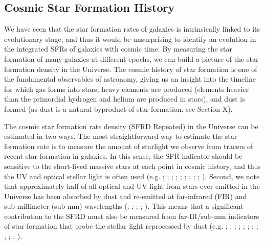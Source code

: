 \subsection{Cosmic Star Formation History}
\label{sec:cosmic_star_formation_history}

We have seen that the star formation rates of galaxies is intrinsically linked to its evolutionary stage, and thus it would be unsurprising to identify an evolution in the integrated SFRs of galaxies with cosmic time. By measuring the star formation of many galaxies at different epochs, we can build a picture of the star formation density in the Universe. The cosmic history of star formation is one of the fundamental observables of astronomy, giving us an insight into the timeline for which gas forms into stars, heavy elements are produced (elements heavier than the primordial hydrogen and helium are produced in stars), and dust is formed (as dust is a natural byproduct of star formation, see Section {\color{red}X}).

The cosmic star formation rate density (SFRD {\color{red}Repeated}) in the Universe can be estimated in two ways. The most straightforward way to estimate the star formation rate is to measure the amount of starlight we observe from tracers of recent star formation in galaxies. In this sense, the SFR indicator should be sensitive to the short-lived massive stars at each point in cosmic history, and thus the UV and optical stellar light is often used (e.g. \citealt{Madau_1996}; \citealt{Lilly_1996}; \citealt{Wyder_2005}; \citealt{Schiminovich_2005}; \citealt{Dahlen_2007}; \citealt{Reddy_2009}; \citealt{Robotham_2011}; \citealt{Cucciati_2012}; \citealt{Schenker_2013}; \citealt{Finkelstein_2015}). Second, we note that approximately half of all optical and UV light from stars ever emitted in the Universe has been absorbed by dust and re-emitted at far-infrared (FIR) and sub-millimeter (sub-mm) wavelengths (\citealt{Puget_1996}; \citealt{Fixsen_1998}; \citealt{Dole_2006}; \citealt{Driver_2008}; \citealt{Driver_2016}). This means that a significant contribution to the SFRD must also be measured from far-IR/sub-mm indicators of star formation that probe the stellar light reprocessed by dust (e.g. \citealt{Magnelli_2011}; \citealt{Casey_2012}; \citealt{Magnelli_2013}; \citealt{Gruppioni_2013}; \citealt{Swinbank_2014}; \citealt{Bouwens_2016}; \citealt{Bourne_2017}; \citealt{Koprowski_2017}; \citealt{Novak_2017}; \citealt{Liu_2018}; \citealt{Bouwens_2020}; \citealt{Dudzeviciute_2020}).

